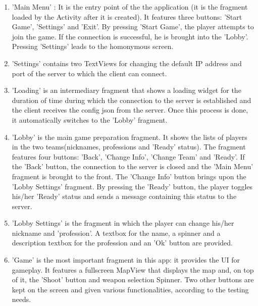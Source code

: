 \begin{enumerate}
  \item 'Main Menu' : It is the entry point of the the application (it is the
  fragment loaded by the Activity after it is created). It features three
  buttons: 'Start Game', 'Settings' and 'Exit'. By pressing 'Start Game', the
  player attempts to join the game. If the connection is successful, he is
  brought into the 'Lobby'. Pressing 'Settings' leads to the homonymous
  screen.
  
  \item 'Settings' contains two TextViews for changing the default IP
  address and port of the server to which the client can connect.
  
  \item 'Loading' is an intermediary fragment that shows a loading widget for
  the duration of time during which the connection to the server is established
  and the client receives the config json from the server. Once this process is
  done, it automatically switches to the 'Lobby' fragment.
  
  \item 'Lobby' is the main game preparation fragment. It shows the lists of
  players in the two teams(nicknames, professions and 'Ready' status). The
  fragment features four buttons: 'Back', 'Change Info', 'Change Team' and
  'Ready'. If the 'Back' button, the connection to the server is closed and the
  'Main Menu' fragment is brought to the front. The 'Change Info' button brings
  upon the 'Lobby Settings' fragment. By pressing the 'Ready' button, the player
  toggles his/her 'Ready' status and sends a message containing this status to
  the server.
  
  \item 'Lobby Settings' is the fragment in which the player can change his/her
  nickname and 'profession'. A textbox for the name, a spinner and a
  description textbox for the profession and an 'Ok' button are provided. 
  
  \item 'Game' is the most important fragment in this app: it provides the UI
  for gameplay. It features a fullscreen MapView that displays the map and, on
  top of it, the 'Shoot' button and weapon selection Spinner. Two other buttons
  are kept on the screen and given various functionalities, according to the
  testing needs.
   
\end{enumerate}


